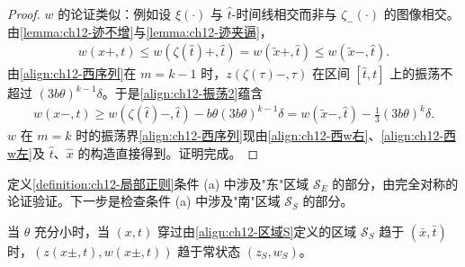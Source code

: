 \documentclass[../../main.tex]{subfiles}
\begin{document}
\begin{proof}
$w$ 的论证类似：例如设 $\xi(\cdot)$ 与 $\hat t$-时间线相交而非与 $\zeta_-(\cdot)$ 的图像相交。由\cref{lemma:ch12-迹不增}与\cref{lemma:ch12-迹夹逼}，
\begin{align}
w(x+,t)\leqslant w(\zeta(\hat t)+,\hat t)=w(\tilde x+,\hat t)\leqslant w(\tilde x-,\hat t).
\label{align:ch12-西w右}
\end{align}
由\eqref{align:ch12-西序列}在 $m=k-1$ 时，$z(\zeta(\tau)-,\tau)$ 在区间 $[\hat t,t]$ 上的振荡不超过 $(3b\theta)^{k-1}\delta$。于是\eqref{align:ch12-振荡2}蕴含
\begin{align}
w(x-,t)\geqslant w(\zeta(\hat t)-,\hat t)-b\theta(3b\theta)^{k-1}\delta=w(\tilde x-,\hat t)-\frac13(3b\theta)^k\delta.
\label{align:ch12-西w左}
\end{align}
$w$ 在 $m=k$ 时的振荡界\eqref{align:ch12-西序列}现由\eqref{align:ch12-西w右}、\eqref{align:ch12-西w左}及 $\hat t$、$\hat x$ 的构造直接得到。证明完成。
\end{proof}

定义\cref{definition:ch12-局部正则}条件 (a) 中涉及"东"区域 $\mathscr{S}_E$ 的部分，由完全对称的论证验证。下一步是检查条件 (a) 中涉及"南"区域 $\mathscr{S}_S$ 的部分。

\begin{lemma}\label{lemma:ch12-南区域}
当 $\theta$ 充分小时，当 $(x,t)$ 穿过由\eqref{align:ch12-区域S}定义的区域 $\mathscr{S}_S$ 趋于 $(\bar x,\bar t)$ 时，$(z(x\pm,t),w(x\pm,t))$ 趋于常状态 $(z_S,w_S)$。
\end{lemma}
\end{document}
